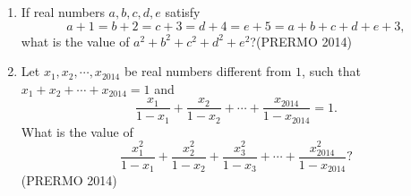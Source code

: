 \begin{enumerate}
\item If real numbers $a, b, c, d, e$ satisfy
    \[
        a + 1 = b + 2 = c + 3 = d + 4 = e + 5 = a + b + c + d + e + 3,
    \]
    what is the value of $a^2 + b^2 + c^2 + d^2 + e^2$?\hfill(PRERMO 2014)
    \item Let $x_1, x_2, \cdots, x_{2014}$ be real numbers different from $1$, such that$x_1 + x_2 + \cdots + x_{2014} = 1$ and
    \[
        \frac{x_1}{1 - x_1} + \frac{x_2}{1 - x_2} + \cdots + \frac{x_{2014}}{1 - x_{2014}} = 1.
    \]
    What is the value of
    \[
        \frac{x_1^2}{1 - x_1} + \frac{x_2^2}{1 - x_2} + \frac{x_3^2}{1 - x_3} + \cdots + \frac{x_{2014}^2}{1 - x_{2014}}?
    \]\hfill(PRERMO 2014)
\end{enumerate}
